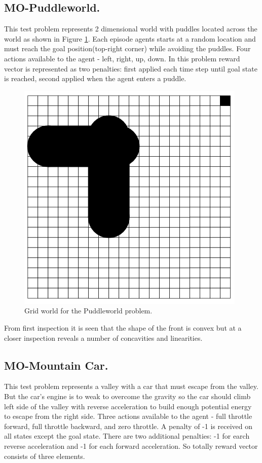 {{\subsection{MO-Puddleworld.}
This test problem represents 2 dimensional world with puddles located across the world as shown in Figure \ref{fig:PWOverview}. Each episode agents starts at a random location and must reach the goal position(top-right corner) while avoiding the puddles. Four actions available to the agent - left, right, up, down. In this problem reward vector is represented as two penalties: first applied each time step until goal state is reached, second applied when the agent enters a puddle.
\begin{figure}[ht]
\vskip 0.2in
\centering
\includegraphics[scale=0.9]{pw.png}
\caption{Grid world for the Puddleworld problem.}
\label{fig:PWOverview}
\end{figure}

From first inspection it is seen that the shape of the front is convex but at a closer inspection reveals a number of concavities and linearities. \\


\subsection{MO-Mountain Car.}
This test problem represents a valley with a car that must escape from the valley. But the car's engine is to weak to overcome the gravity so the car should climb left side of the valley with reverse acceleration to build enough potential energy to escape from the right side. Three actions available to the agent - full
throttle forward, full throttle backward, and zero throttle. A penalty of -1 is received on all states except the goal state. There are two additional penalties: -1 for earch reverse acceleration and -1 for each forward acceleration. So totally reward vector consists of three elements. \\

}}

